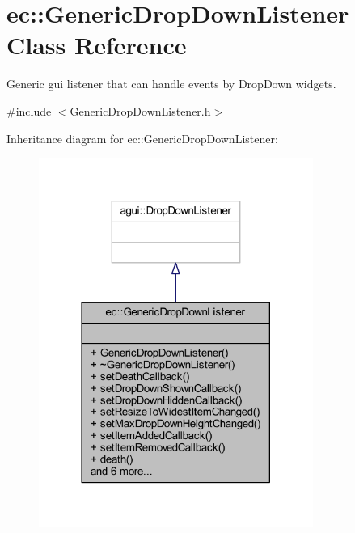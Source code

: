 \hypertarget{classec_1_1_generic_drop_down_listener}{}\section{ec\+:\+:Generic\+Drop\+Down\+Listener Class Reference}
\label{classec_1_1_generic_drop_down_listener}


Generic gui listener that can handle events by Drop\+Down widgets.  




{\ttfamily \#include $<$Generic\+Drop\+Down\+Listener.\+h$>$}



Inheritance diagram for ec\+:\+:Generic\+Drop\+Down\+Listener\+:\nopagebreak
\begin{figure}[H]
\begin{center}
\leavevmode
\includegraphics[width=254pt]{classec_1_1_generic_drop_down_listener__inherit__graph}
\end{center}
\end{figure}



